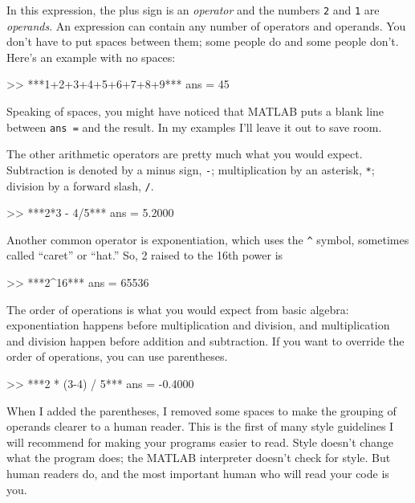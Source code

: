 In this expression, the plus sign is an \emph{operator} and the numbers \lstinline{2} and \lstinline{1} are \emph{operands}.
An expression can contain any number of operators and operands.  You
don't have to put spaces between them; some people do and some people
don't. Here's an example with no spaces:

\begin{code}
>> ***1+2+3+4+5+6+7+8+9***
ans = 45
\end{code}

Speaking of spaces, you might have noticed that MATLAB puts a blank
line between \lstinline{ans =} and the result.  In my examples I'll leave it out to save room.


The other arithmetic operators are pretty much what you would expect.
Subtraction is denoted by a minus sign, \lstinline{-}; multiplication by
an asterisk, \lstinline{*}; division by a forward slash, \lstinline{/}.

\begin{code}
>> ***2*3 - 4/5***
ans = 5.2000
\end{code}

Another common operator is exponentiation, which uses the \lstinline{^}
symbol, sometimes called ``caret'' or ``hat.''  So, 2 raised to the
16th power is

\begin{code}
>> ***2^16***
ans = 65536
\end{code}

The order of operations is what you would expect from basic algebra:
exponentiation happens before multiplication and division, and multiplication and division happen before addition and subtraction.
If you want to override the order of operations, you can use parentheses.


\begin{code}
>> ***2 * (3-4) / 5***
ans = -0.4000
\end{code}

When I added the parentheses, I removed some spaces to make the
grouping of operands clearer to a human reader.  This is the first
of many style guidelines I will recommend for making your programs
easier to read.  Style doesn't change what the program does; the MATLAB
interpreter doesn't check for style.  But human readers do, and the
most important human who will read your code is you.

